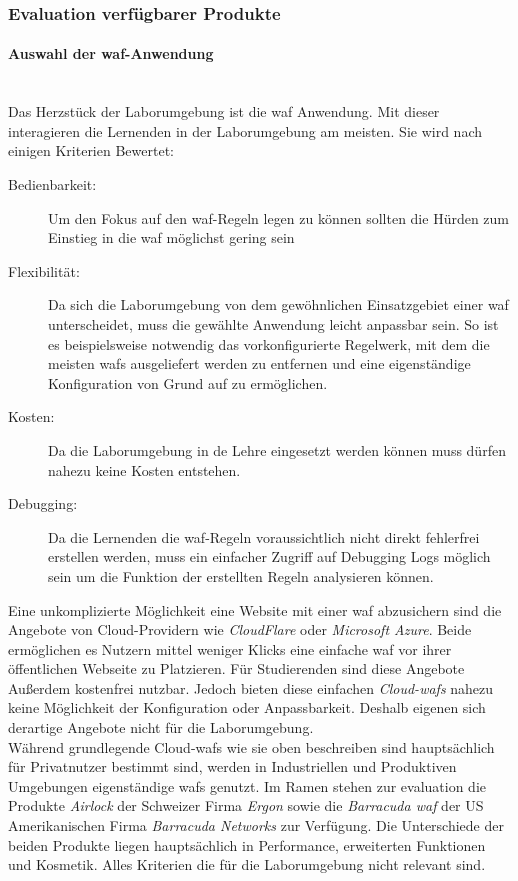 \subsubsection{Evaluation verfügbarer Produkte}
\label{sec:product-evaluation}

\paragraph{Auswahl der \ac{waf}-Anwendung}\ \\

Das Herzstück der Laborumgebung ist die \ac{waf} Anwendung.
Mit dieser interagieren die Lernenden in der Laborumgebung am meisten.
Sie wird nach einigen Kriterien Bewertet:
\begin{description}
    \item[Bedienbarkeit:] Um den Fokus auf den \ac{waf}-Regeln legen zu können sollten die Hürden zum Einstieg in die \ac{waf} möglichst gering sein
    \item[Flexibilität:] Da sich die Laborumgebung von dem gewöhnlichen Einsatzgebiet einer \ac{waf} unterscheidet, muss die gewählte Anwendung leicht anpassbar sein.
    So ist es beispielsweise notwendig das vorkonfigurierte Regelwerk, mit dem die meisten \acp{waf} ausgeliefert werden zu entfernen und eine eigenständige Konfiguration von Grund auf zu ermöglichen.
    \item[Kosten:] Da die Laborumgebung in de Lehre eingesetzt werden können muss dürfen nahezu keine Kosten entstehen.
    \item[Debugging:] Da die Lernenden die \ac{waf}-Regeln voraussichtlich nicht direkt fehlerfrei erstellen werden, muss ein einfacher Zugriff auf Debugging Logs möglich sein um die Funktion der erstellten Regeln analysieren können.
\end{description}

Eine unkomplizierte Möglichkeit eine Website mit einer \ac{waf} abzusichern sind die Angebote von Cloud-Providern wie \textit{CloudFlare} oder \textit{Microsoft Azure}.
Beide ermöglichen es Nutzern mittel weniger Klicks eine einfache \ac{waf} vor ihrer öffentlichen Webseite zu Platzieren.
Für Studierenden sind diese Angebote Außerdem kostenfrei nutzbar.
Jedoch bieten diese einfachen \textit{Cloud-\acp{waf}} nahezu keine Möglichkeit der Konfiguration oder Anpassbarkeit.
Deshalb eigenen sich derartige Angebote nicht für die Laborumgebung.\\

Während grundlegende Cloud-\acp{waf} wie sie oben beschreiben sind hauptsächlich für Privatnutzer bestimmt sind, werden in Industriellen und Produktiven Umgebungen eigenständige \acp{waf} genutzt.
Im Ramen stehen zur evaluation die Produkte \textit{Airlock} der Schweizer Firma \textit{Ergon} sowie die \textit{Barracuda \ac{waf}} der US Amerikanischen Firma \textit{Barracuda Networks} zur Verfügung.
Die Unterschiede der beiden Produkte liegen hauptsächlich in Performance, erweiterten Funktionen und Kosmetik.
Alles Kriterien die für die Laborumgebung nicht relevant sind.

